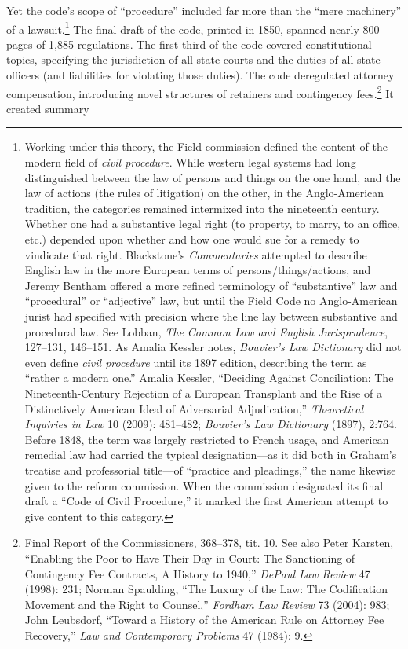 \documentclass[12pt,]{article}
\let\rmarkdownfootnote\footnote%
\def\footnote{\protect\rmarkdownfootnote}
\begin{document}
Yet the code's scope of ``procedure'' included far more than the ``mere
machinery'' of a lawsuit.\footnote{Working under this theory, the Field
  commission defined the content of the modern field of \emph{civil
  procedure}. While western legal systems had long distinguished between
  the law of persons and things on the one hand, and the law of actions
  (the rules of litigation) on the other, in the Anglo-American
  tradition, the categories remained intermixed into the nineteenth
  century. Whether one had a substantive legal right (to property, to
  marry, to an office, etc.) depended upon whether and how one would sue
  for a remedy to vindicate that right. Blackstone's \emph{Commentaries}
  attempted to describe English law in the more European terms of
  persons/things/actions, and Jeremy Bentham offered a more refined
  terminology of ``substantive'' law and ``procedural'' or ``adjective''
  law, but until the Field Code no Anglo-American jurist had specified
  with precision where the line lay between substantive and procedural
  law. See Lobban, \emph{The Common Law and English Jurisprudence},
  127--131, 146--151. As Amalia Kessler notes, \emph{Bouvier's Law
  Dictionary} did not even define \emph{civil procedure} until its 1897
  edition, describing the term as ``rather a modern one.'' Amalia
  Kessler, ``Deciding Against Conciliation: The Nineteenth-Century
  Rejection of a European Transplant and the Rise of a Distinctively
  American Ideal of Adversarial Adjudication,'' \emph{Theoretical
  Inquiries in Law} 10 (2009): 481--482; \emph{Bouvier's Law Dictionary}
  (1897), 2:764. Before 1848, the term was largely restricted to French
  usage, and American remedial law had carried the typical
  designation---as it did both in Graham's treatise and professorial
  title---of ``practice and pleadings,'' the name likewise given to the
  reform commission. When the commission designated its final draft a
  ``Code of Civil Procedure,'' it marked the first American attempt to
  give content to this category.} The final draft of the code, printed
in 1850, spanned nearly 800 pages of 1,885 regulations. The first third
of the code covered constitutional topics, specifying the jurisdiction
of all state courts and the duties of all state officers (and
liabilities for violating those duties). The code deregulated attorney
compensation, introducing novel structures of retainers and contingency
fees.\footnote{Final Report of the Commissioners, 368--378, tit. 10. See
  also Peter Karsten, ``Enabling the Poor to Have Their Day in Court:
  The Sanctioning of Contingency Fee Contracts, A History to 1940,''
  \emph{DePaul Law Review} 47 (1998): 231; Norman Spaulding, ``The
  Luxury of the Law: The Codification Movement and the Right to
  Counsel,'' \emph{Fordham Law Review} 73 (2004): 983; John Leubsdorf,
  ``Toward a History of the American Rule on Attorney Fee Recovery,''
  \emph{Law and Contemporary Problems} 47 (1984): 9.} It created summary
\end{document}
